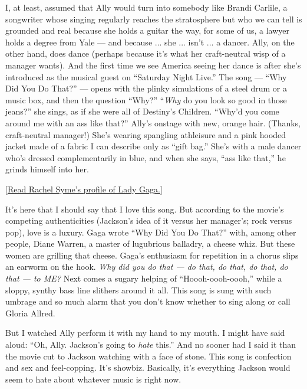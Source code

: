 I, at least, assumed that Ally would turn into somebody like Brandi
Carlile, a songwriter whose singing regularly reaches the stratosphere
but who we can tell is grounded and real because she holds a guitar the
way, for some of us, a lawyer holds a degree from Yale --- and because
... she ... isn't ... a dancer. Ally, on the other hand, does dance
(perhaps because it's what her craft-neutral wisp of a manager wants).
And the first time we see America seeing her dance is after she's
introduced as the musical guest on ``Saturday Night Live.'' The song ---
``Why Did You Do That?'' --- opens with the plinky simulations of a
steel drum or a music box, and then the question ``Why?'' ``\emph{Why}
do you look so good in those jeans?'' she sings, as if she were all of
Destiny's Children. ``Why'd you come around me with an ass like that?''
Ally's onstage with new, orange hair. (Thanks, craft-neutral manager!)
She's wearing spangling athleisure and a pink hooded jacket made of a
fabric I can describe only as ``gift bag.'' She's with a male dancer
who's dressed complementarily in blue, and when she says, ``ass like
that,'' he grinds himself into her.

\href{https://www.nytimes3xbfgragh.onion/interactive/2018/10/03/magazine/lady-gaga-movie-star-is-born.html}{{[}Read
Rachel Syme's profile of Lady Gaga.{]}}

It's here that I should say that I love this song. But according to the
movie's competing authenticities (Jackson's idea of it versus her
manager's; rock versus pop), love is a luxury. Gaga wrote ``Why Did You
Do That?'' with, among other people, Diane Warren, a master of
lugubrious balladry, a cheese whiz. But these women are grilling that
cheese. Gaga's enthusiasm for repetition in a chorus slips an earworm on
the hook. \emph{Why did you do that --- do that, do that, do that, do
that --- to ME?} Next comes a sugary helping of ``Hoooh-oooh-oooh,''
while a sloppy, synthy bass line slithers around it all. This song is
sung with such umbrage and so much alarm that you don't know whether to
sing along or call Gloria Allred.

But I watched Ally perform it with my hand to my mouth. I might have
said aloud: ``Oh, Ally. Jackson's going to \emph{hate} this.'' And no
sooner had I said it than the movie cut to Jackson watching with a face
of stone. This song is confection and sex and feel-copping. It's
showbiz. Basically, it's everything Jackson would seem to hate about
whatever music is right now.


